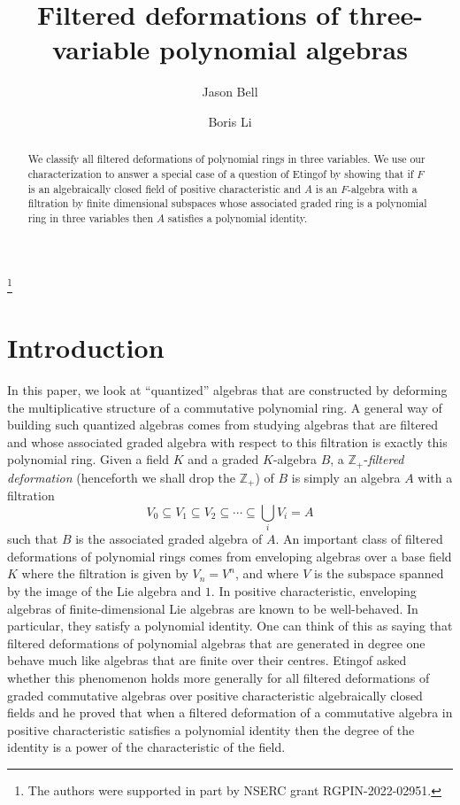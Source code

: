 \documentclass[a4paper,11pt,twoside,notitlepage,reqno]{amsart}
\theoremstyle{plain}
\numberwithin{thm}{section}
\theoremstyle{definition}
\begin{document}
\title[]
{Filtered deformations of three-variable polynomial algebras}


\author{Jason Bell}
\author{Boris Li}
\address{University of Waterloo \\
Department of Pure Mathematics \\
Waterloo, Ontario \\
Canada  N2L 3G1}
\thanks{The authors were supported in part by NSERC grant RGPIN-2022-02951.}
\begin{abstract}
    We classify all filtered deformations of polynomial rings in three variables.  We use our characterization to answer a special case of a question of Etingof by showing that if $F$ is an algebraically closed field of positive characteristic and $A$ is an $F$-algebra with a filtration by finite dimensional subspaces whose associated graded ring is a polynomial ring in three variables then $A$ satisfies a polynomial identity.  \end{abstract}
\maketitle

\section{Introduction}
In this paper, we look at ``quantized'' algebras that are constructed by deforming the multiplicative structure of a commutative polynomial ring. A general way of building such quantized algebras comes from studying algebras that are filtered and whose associated graded algebra with respect to this filtration is exactly this polynomial ring.  Given a field $K$ and a graded $K$-algebra $B$, a $\mathbb{Z}_+$-\emph{filtered deformation} (henceforth we shall drop the $\mathbb{Z}_+$) of $B$ is simply an algebra $A$ with a filtration 
\begin{equation}\label{eq:filt}
V_0\subseteq V_1 \subseteq V_2 \subseteq \cdots \subseteq \bigcup_i V_i=A
\end{equation} such that $B$ is the associated graded algebra of $A$.  An important class of filtered deformations of polynomial rings comes from enveloping algebras over a base field $K$ where the filtration is given by $V_n=V^n$, and where $V$ is the subspace spanned by the image of the Lie algebra and $1$.  In positive characteristic, enveloping algebras of finite-dimensional Lie algebras are known to be well-behaved.  In particular, they satisfy a polynomial identity.  One can think of this as saying that filtered deformations of polynomial algebras that are generated in degree one behave much like algebras that are finite over their centres.  Etingof \cite[Question 1.1]{Etingof} asked whether this phenomenon holds more generally for all filtered deformations of graded commutative algebras over positive characteristic algebraically closed fields and he proved that when a filtered deformation of a commutative algebra in positive characteristic satisfies a polynomial identity then the degree of the identity is a power of the characteristic of the field.
\end{document}
